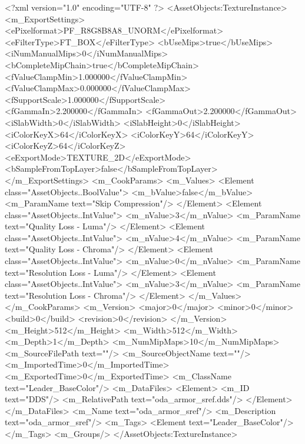 <?xml version="1.0" encoding="UTF-8" ?>
<AssetObjects:TextureInstance>
<m_ExportSettings>
<ePixelformat>PF_R8G8B8A8_UNORM</ePixelformat>
<eFilterType>FT_BOX</eFilterType>
<bUseMips>true</bUseMips>
<iNumManualMips>0</iNumManualMips>
<bCompleteMipChain>true</bCompleteMipChain>
<fValueClampMin>1.000000</fValueClampMin>
<fValueClampMax>0.000000</fValueClampMax>
<fSupportScale>1.000000</fSupportScale>
<fGammaIn>2.200000</fGammaIn>
<fGammaOut>2.200000</fGammaOut>
<iSlabWidth>0</iSlabWidth>
<iSlabHeight>0</iSlabHeight>
<iColorKeyX>64</iColorKeyX>
<iColorKeyY>64</iColorKeyY>
<iColorKeyZ>64</iColorKeyZ>
<eExportMode>TEXTURE_2D</eExportMode>
<bSampleFromTopLayer>false</bSampleFromTopLayer>
</m_ExportSettings>
<m_CookParams>
<m_Values>
<Element class="AssetObjects..BoolValue">
<m_bValue>false</m_bValue>
<m_ParamName text="Skip Compression"/>
</Element>
<Element class="AssetObjects..IntValue">
<m_nValue>3</m_nValue>
<m_ParamName text="Quality Loss - Luma"/>
</Element>
<Element class="AssetObjects..IntValue">
<m_nValue>4</m_nValue>
<m_ParamName text="Quality Loss - Chroma"/>
</Element>
<Element class="AssetObjects..IntValue">
<m_nValue>0</m_nValue>
<m_ParamName text="Resolution Loss - Luma"/>
</Element>
<Element class="AssetObjects..IntValue">
<m_nValue>3</m_nValue>
<m_ParamName text="Resolution Loss - Chroma"/>
</Element>
</m_Values>
</m_CookParams>
<m_Version>
<major>0</major>
<minor>0</minor>
<build>0</build>
<revision>0</revision>
</m_Version>
<m_Height>512</m_Height>
<m_Width>512</m_Width>
<m_Depth>1</m_Depth>
<m_NumMipMaps>10</m_NumMipMaps>
<m_SourceFilePath text=""/>
<m_SourceObjectName text=""/>
<m_ImportedTime>0</m_ImportedTime>
<m_ExportedTime>0</m_ExportedTime>
<m_ClassName text="Leader_BaseColor"/>
<m_DataFiles>
<Element>
<m_ID text="DDS"/>
<m_RelativePath text="oda_armor_sref.dds"/>
</Element>
</m_DataFiles>
<m_Name text="oda_armor_sref"/>
<m_Description text="oda_armor_sref"/>
<m_Tags>
<Element text="Leader_BaseColor"/>
</m_Tags>
<m_Groups/>
</AssetObjects:TextureInstance>
